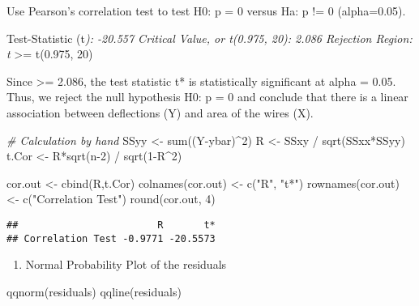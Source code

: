 \documentclass[
]{article}
\newenvironment{Shaded}{\begin{snugshade}}{\end{snugshade}}
\newcommand{\CommentTok}[1]{\textcolor[rgb]{0.56,0.35,0.01}{\textit{#1}}}
\newcommand{\DecValTok}[1]{\textcolor[rgb]{0.00,0.00,0.81}{#1}}
\newcommand{\FunctionTok}[1]{\textcolor[rgb]{0.00,0.00,0.00}{#1}}
\newcommand{\NormalTok}[1]{#1}
\newcommand{\OtherTok}[1]{\textcolor[rgb]{0.56,0.35,0.01}{#1}}
\newcommand{\SpecialCharTok}[1]{\textcolor[rgb]{0.00,0.00,0.00}{#1}}
\newcommand{\StringTok}[1]{\textcolor[rgb]{0.31,0.60,0.02}{#1}}
\providecommand{\tightlist}{%
  \setlength{\itemsep}{0pt}\setlength{\parskip}{0pt}}
\begin{document}
Use Pearson's correlation test to test H0: p = 0 versus Ha: p != 0
(alpha=0.05).

Test-Statistic (t\emph{): -20.557 Critical Value, or t(0.975, 20): 2.086
Rejection Region: \textbar t}\textbar{} \textgreater= t(0.975, 20)

Since \textbar{} \textgreater= 2.086, the test statistic
t* is statistically significant at alpha = 0.05. Thus, we reject the
null hypothesis H0: p = 0 and conclude that there is a linear
association between deflections (Y) and area of the wires (X).

\begin{Shaded}
\begin{Highlighting}[]
\CommentTok{\# Calculation by hand}
\NormalTok{SSyy }\OtherTok{\textless{}{-}} \FunctionTok{sum}\NormalTok{((Y}\SpecialCharTok{{-}}\NormalTok{ybar)}\SpecialCharTok{\^{}}\DecValTok{2}\NormalTok{)}
\NormalTok{R }\OtherTok{\textless{}{-}}\NormalTok{ SSxy }\SpecialCharTok{/} \FunctionTok{sqrt}\NormalTok{(SSxx}\SpecialCharTok{*}\NormalTok{SSyy)}
\NormalTok{t.Cor }\OtherTok{\textless{}{-}}\NormalTok{ R}\SpecialCharTok{*}\FunctionTok{sqrt}\NormalTok{(n}\DecValTok{{-}2}\NormalTok{) }\SpecialCharTok{/} \FunctionTok{sqrt}\NormalTok{(}\DecValTok{1}\SpecialCharTok{{-}}\NormalTok{R}\SpecialCharTok{\^{}}\DecValTok{2}\NormalTok{)}

\NormalTok{cor.out }\OtherTok{\textless{}{-}} \FunctionTok{cbind}\NormalTok{(R,t.Cor)}
\FunctionTok{colnames}\NormalTok{(cor.out) }\OtherTok{\textless{}{-}} \FunctionTok{c}\NormalTok{(}\StringTok{"R"}\NormalTok{, }\StringTok{"t*"}\NormalTok{)}
\FunctionTok{rownames}\NormalTok{(cor.out) }\OtherTok{\textless{}{-}} \FunctionTok{c}\NormalTok{(}\StringTok{"Correlation Test"}\NormalTok{)}
\FunctionTok{round}\NormalTok{(cor.out, }\DecValTok{4}\NormalTok{)}
\end{Highlighting}
\end{Shaded}

\begin{verbatim}
##                        R       t*
## Correlation Test -0.9771 -20.5573
\end{verbatim}

\begin{enumerate}
\def\labelenumi{\alph{enumi})}
\setcounter{enumi}{4}
\tightlist
\item
  Normal Probability Plot of the residuals
\end{enumerate}

\begin{Shaded}
\begin{Highlighting}[]
\FunctionTok{qqnorm}\NormalTok{(residuals)}
\FunctionTok{qqline}\NormalTok{(residuals)}
\end{Highlighting}
\end{Shaded}
\end{document}
